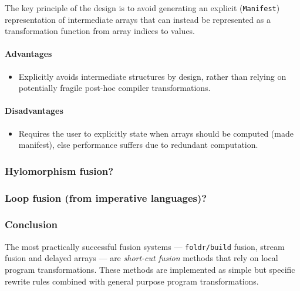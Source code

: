 The key principle of the design is to avoid generating an explicit
(\texttt{Manifest}) representation of intermediate arrays that can instead be
represented as a transformation function from array indices to values.


\paragraph{Advantages}
\begin{itemize}
    \item Explicitly avoids intermediate structures by design, rather than
        relying on potentially fragile post-hoc compiler transformations.
\end{itemize}

\paragraph{Disadvantages}
\begin{itemize}
    \item Requires the user to explicitly state when arrays should be computed
        (made manifest), else performance suffers due to redundant computation.
\end{itemize}

\subsubsection{Hylomorphism fusion?}
\citet{Takano:1995}

\subsubsection{Loop fusion (from imperative languages)?}
\citet{Warren:1984ka,Sarkar:1991ff}


\subsubsection{Conclusion}

The most practically successful fusion systems ---
\texttt{foldr/build} fusion,
stream fusion and delayed arrays --- are \emph{short-cut fusion} methods that
rely on local program transformations. These methods are implemented as simple
but specific rewrite rules combined with general purpose program
transformations.

